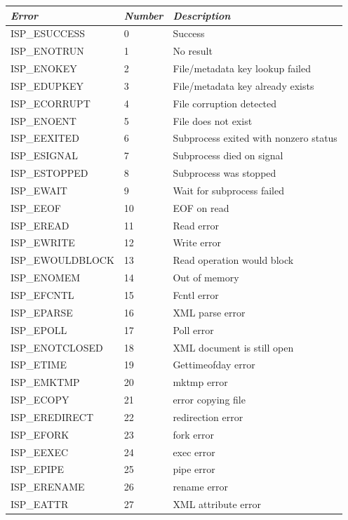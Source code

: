 \documentclass{article}
\begin{document}
\begin{table}
\begin{center}
\begin{tabular}{|l|l|l|}\hline
{\em Error} & {\em Number} & {\em Description}\\
\hline
ISP\_ESUCCESS &      0  &Success\\
ISP\_ENOTRUN  &      1  &No result\\
ISP\_ENOKEY   &      2  &File/metadata key lookup failed\\
ISP\_EDUPKEY  &      3  &File/metadata key already exists\\
ISP\_ECORRUPT &      4  &File corruption detected\\
ISP\_ENOENT   &      5  &File does not exist\\
ISP\_EEXITED  &      6  &Subprocess exited with nonzero status\\
ISP\_ESIGNAL  &      7  &Subprocess died on signal\\
ISP\_ESTOPPED &      8  &Subprocess was stopped\\
ISP\_EWAIT    &      9  &Wait for subprocess failed\\
ISP\_EEOF     &      10 &EOF on read\\
ISP\_EREAD    &      11 &Read error\\
ISP\_EWRITE   &      12 &Write error\\
ISP\_EWOULDBLOCK&    13 &Read operation would block\\
ISP\_ENOMEM   &      14 &Out of memory\\
ISP\_EFCNTL   &      15 &Fcntl error\\
ISP\_EPARSE   &      16 &XML parse error\\
ISP\_EPOLL    &      17 &Poll error\\
ISP\_ENOTCLOSED&     18 &XML document is still open\\
ISP\_ETIME    &      19 &Gettimeofday error\\
ISP\_EMKTMP   &      20 &mktmp error\\
ISP\_ECOPY    &      21 &error copying file\\
ISP\_EREDIRECT&      22 &redirection error\\
ISP\_EFORK    &      23 &fork error\\
ISP\_EEXEC    &      24 &exec error\\
ISP\_EPIPE    &      25 &pipe error\\
ISP\_ERENAME  &      26 &rename error\\
ISP\_EATTR    &      27 &XML attribute error\\

\end{tabular}
\end{center}
\end{table}
\end{document}

